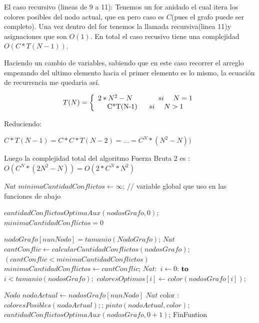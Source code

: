El caso recursivo (lineas de 9 a 11): \newline
Tenemos un for anidado el cual itera los colores posibles del nodo actual, que en pero caso es $C$(pues el grafo puede ser completo). Una vez dentro del for tenemos la llamada recursiva(linea 11)y asignaciones que son $O(1)$. En total el caso recusivo tiene una complejidad $O(C*T(N-1))$. \newline

Haciendo un cambio de variables, sabiendo que en este caso recorrer el arreglo empezando del  ultimo elemento hacia el primer elemento es lo mismo, la ecuación de recurrencia me quedaria así.
  
\begin{equation*}
T(N) = \left\lbrace
\begin{array}{c}
		2*N^2 - N \ \ \ \ \ \ \ \ \ \ \ si \ \ \ \   N = 1 \\
		$C*T(N-1)$  \  \ \ \  \ si \ \ \ \  N>1 \\
\end{array}
\right.
\end{equation*}
 
Reduciendo: 
\begin{center}
$C*T(N-1) = C*C*T(N-2)= ...= C^N*(N^2-N)) $ \newline
\end{center}

Luego la complejidad total del algoritmo Fuerza Bruta 2 es : $O(C^N * (2N^2-N)) = O(2*C^N*N^2)$

\vspace*{0.3cm}
\begin{codebox}
	\li $Nat$  $minimaCantidadConflictos \leftarrow \infty$; // variable global que uso en las funciones de abajo
\end{codebox}

\begin{codebox}
	\li $cantidadConflictosOptimaAux(nodosGrafo,0)$;
	\li \Return  $minimaCantidadConflictos=0$%
\end{codebox}

\begin{codebox}
	\li {}
	\li \If $nodoGrafo  [ nunNodo ] = tamanio(NodoGrafo)$; 
			\Then
	\li		$Nat$ $cantConflic \leftarrow calcularCantidadConflictos(nodosGrafo)$;
	\li 	\If $(cantConflic<minimaCantidadConflictos)$
	\li			\Then $minimaCantidadConflictos \leftarrow cantConflic$;
	\li				\For $Nat:$ $i \leftarrow 0 $:$ \To $ $i<tamanio(nodosGrafo); $\Do
	\li					$coloresOptimos[i] \leftarrow color(nodosGrafo[i])$;
					\End
			\End
		\End 				
 
	\li $Nodo$ $nodoActual \leftarrow nodosGrafo[nunNodo]$
	\li	\For $Nat$ color $:$ \To $ coloresPosibles(nodoActual); $; \Comment{} \Do 
	\li			$ pinto(nodoActual, color)$;	
	\li			$cantidadConflictosOptimaAux(nodosGrafo,0+1)$;
		\End
	\li FinFuntion	
\end{codebox}


